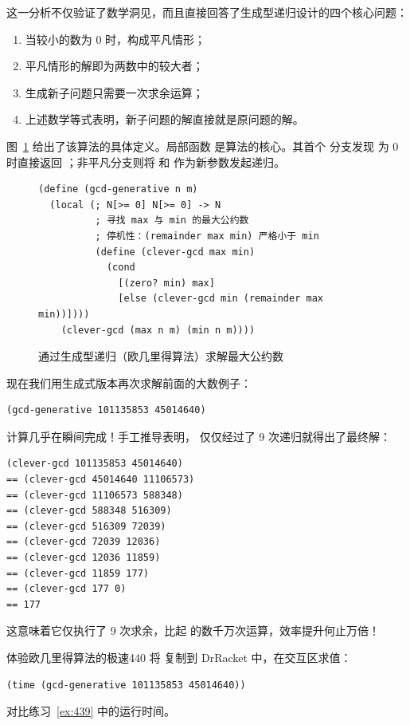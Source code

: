 这一分析不仅验证了数学洞见，而且直接回答了生成型递归设计的四个核心问题：
\begin{enumerate}
  \item 当较小的数为 0 时，构成平凡情形；
  \item 平凡情形的解即为两数中的较大者；
  \item 生成新子问题只需要一次求余运算；
  \item 上述数学等式表明，新子问题的解直接就是原问题的解。
\end{enumerate}

图~\ref{fig:gcd-generative} 给出了该算法的具体定义。局部函数  是算法的核心。其首个  分支发现  为 0 时直接返回 ；非平凡分支则将  和  作为新参数发起递归。

\begin{figure}[htbp]
  \centering
\begin{lstlisting}[language=BSL]
(define (gcd-generative n m)
  (local (; N[>= 0] N[>= 0] -> N
          ; 寻找 max 与 min 的最大公约数
          ; 停机性：(remainder max min) 严格小于 min
          (define (clever-gcd max min)
            (cond
              [(zero? min) max]
              [else (clever-gcd min (remainder max min))])))
    (clever-gcd (max n m) (min n m))))
\end{lstlisting}
  \caption{通过生成型递归（欧几里得算法）求解最大公约数}
  \label{fig:gcd-generative}
\end{figure}

现在我们用生成式版本再次求解前面的大数例子：
\begin{lstlisting}[language=BSL]
(gcd-generative 101135853 45014640)
\end{lstlisting}
计算几乎在瞬间完成！手工推导表明， 仅仅经过了 9 次递归就得出了最终解：
\begin{lstlisting}[language=BSL]
   (clever-gcd 101135853 45014640)
== (clever-gcd 45014640 11106573)
== (clever-gcd 11106573 588348)
== (clever-gcd 588348 516309)
== (clever-gcd 516309 72039)
== (clever-gcd 72039 12036)
== (clever-gcd 12036 11859)
== (clever-gcd 11859 177)
== (clever-gcd 177 0)
== 177
\end{lstlisting}
这意味着它仅执行了 9 次求余，比起  的数千万次运算，效率提升何止万倍！

\begin{exercise}{体验欧几里得算法的极速}{440}\label{ex:440}
将  复制到 DrRacket 中，在交互区求值：
\begin{lstlisting}[language=BSL]
(time (gcd-generative 101135853 45014640))
\end{lstlisting}
对比练习~\ref{ex:439} 中的运行时间。
\end{exercise}

